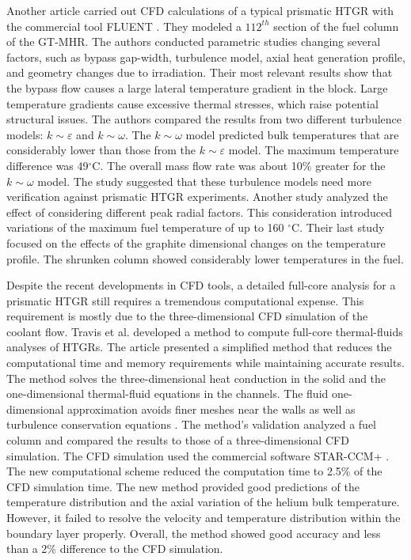 Another article \cite{sato_computational_2010} carried out \gls{CFD} calculations of a typical prismatic \gls{HTGR} with the commercial tool FLUENT \cite{fluent_inc_fluent_2006}.
They modeled a ${1}{12^{th}}$ section of the fuel column of the GT-MHR.
The authors conducted parametric studies changing several factors, such as bypass gap-width, turbulence model, axial heat generation profile, and geometry changes due to irradiation.
Their most relevant results show that the bypass flow causes a large lateral temperature gradient in the block.
Large temperature gradients cause excessive thermal stresses, which raise potential structural issues.
The authors compared the results from two different turbulence models: $k \sim \varepsilon$ and $k \sim \omega$.
The $k \sim \omega$ model predicted bulk temperatures that are considerably lower than those from the $k \sim \varepsilon$ model.
The maximum temperature difference was 49$^{\circ}$C.
The overall mass flow rate was about 10$\%$ greater for the $k \sim \omega$ model.
The study suggested that these turbulence models need more verification against prismatic \gls{HTGR} experiments.
Another study analyzed the effect of considering different peak radial factors.
This consideration introduced variations of the maximum fuel temperature of up to 160 $^{\circ}$C.
Their last study focused on the effects of the graphite dimensional changes on the temperature profile.
The shrunken column showed considerably lower temperatures in the fuel.

Despite the recent developments in CFD tools, a detailed full-core analysis for a prismatic \gls{HTGR} still requires a tremendous computational expense.
This requirement is mostly due to the three-dimensional CFD simulation of the coolant flow.
Travis et al. \cite{travis_thermalhydraulics_2013} developed a method to compute full-core thermal-fluids analyses of \glspl{HTGR}.
The article presented a simplified method that reduces the computational time and memory requirements while maintaining accurate results.
The method solves the three-dimensional heat conduction in the solid and the one-dimensional thermal-fluid equations in the channels.
The fluid one-dimensional approximation avoids finer meshes near the walls as well as turbulence conservation equations \cite{tak_development_2014}.
The method's validation analyzed a fuel column and compared the results to those of a three-dimensional CFD simulation.
The CFD simulation used the commercial software STAR-CCM+ \cite{cd-adapco_star-ccm_2012}.
The new computational scheme reduced the computation time to 2.5\% of the CFD simulation time.
The new method provided good predictions of the temperature distribution and the axial variation of the helium bulk temperature.
However, it failed to resolve the velocity and temperature distribution within the boundary layer properly.
Overall, the method showed good accuracy and less than a 2\% difference to the CFD simulation.

